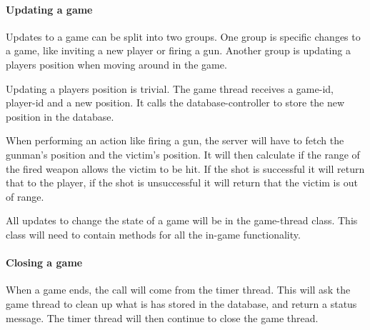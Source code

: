 \paragraph{Updating a game}
Updates to a game can be split into two groups. One group is specific changes to a game, like inviting a new player or firing a gun. Another group is updating a players position when moving around in the game.

Updating a players position is trivial. The game thread receives a game-id, player-id and a new position. It calls the database-controller to store the new position in the database.

When performing an action like firing a gun, the server will have to fetch the gunman's position and the victim's position. It will then calculate if the range of the fired weapon allows the victim to be hit. If the shot is successful it will return that to the player, if the shot is unsuccessful it will return that the victim is out of range. 

All updates to change the state of a game will be in the game-thread class. This class will need to contain methods for all the in-game functionality. 

\paragraph{Closing a game}
When a game ends, the call will come from the timer thread. This will ask the game thread to clean up what is has stored in the database, and return a status message. The timer thread will then continue to close the game thread. 